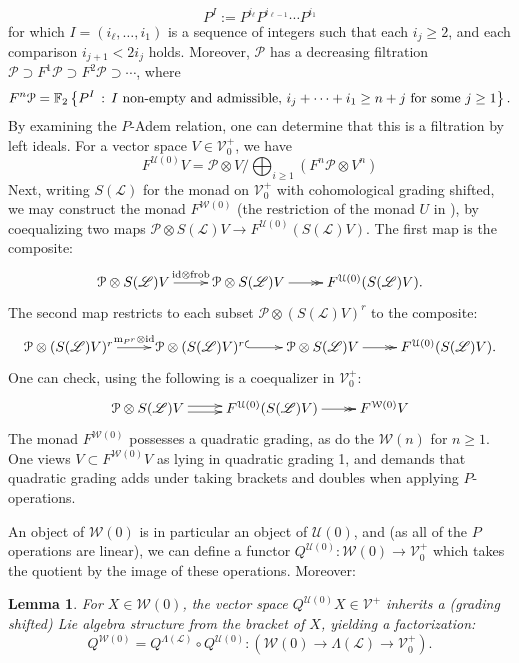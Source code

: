 \documentclass[11pt]{amsart}
\theoremstyle{plain}
\newtheorem{lem}[thm]{Lemma}
\theoremstyle{definition}
\renewcommand{\to}{\longrightarrow}
\newcommand{\scrL}{\mathscr{L}}
\newcommand{\calU}{\mathcal{U}}
\newcommand{\calP}{\mathcal{P}}
\newcommand{\calL}{\mathcal{L}}
\newcommand{\calV}{\mathcal{V}}
\newcommand{\calw}{\mathcal{W}}
\theoremstyle{plain}
\newcommand{\Palg}{{\calP}}
\newcommand{\LieOperad}{{\scrL}}
\newcommand{\vect}[2]{\calV^{#1}_{#2}}
\newcommand{\F}{\mathbb{F}}
\newcommand{\Id}{\textup{id}}
\newcommand{\Ftwo}{\F_2}
\begin{document}
\begin{Constructing (co)homotopy operations}
\begin{shaded}
\[P^I:=P^{i_\ell}P^{i_{\ell-1}}\cdots P^{i_1}\]
for which $I=(i_\ell,\ldots,i_1)$ is a sequence of integers such that each $i_j\geq2$, and  each comparison $i_{j+1}< 2i_j$ holds. Moreover, $\Palg$ has a decreasing filtration $\Palg\supset F^1\Palg\supset F^2\Palg\supset\cdots $, where
\[F^n\Palg=\Ftwo \left\{P^I\,:\,\textup{$I$ non-empty and admissible, }i_j+\cdots +i_1\geq n+j\textup{ for some $j\geq 1$}\right\}.\]
By examining the $P$-Adem relation, one can determine that this is a filtration by left ideals. For a vector space $V\in\vect{+}{0}$, we have
\[F^{\calU(0)}V=\Palg\otimes V/\bigoplus_{i\geq1}(F^n\Palg\otimes V^n)\]
Next, writing $S(\LieOperad)$ for the monad on $\vect{+}{0}$ with cohomological grading shifted, we may construct the monad $F^{\calw(0)}$ (the restriction of the monad $U$ in \cite[p.\ 18]{MR1089001}), by coequalizing two maps $\Palg\otimes S(\LieOperad)V\to F^{\calU(0)} (S(\LieOperad)V)$. The first map is the composite:
\[\xymatrix@R=4mm{
\Palg\otimes S(\LieOperad)V\ar[r]^-{\Id\otimes \textup{frob}}
&%
\Palg\otimes S(\LieOperad)V\ar@{->>}[r]&%
F^{\calU(0)}(S(\LieOperad)V).%
}\]
The second map restricts to each subset $\Palg\otimes (S(\LieOperad)V)^r$ to the composite:
\[\xymatrix@R=4mm{
\Palg\otimes (S(\LieOperad)V)^r\ar[r]^-{\textup{m}_{P^r}\otimes\Id}
&
\Palg\otimes (S(\LieOperad)V)^r\ar@{^{(}->}[r]
&%
\Palg\otimes S(\LieOperad)V\ar@{->>}[r]&%
F^{\calU(0)}(S(\LieOperad)V).%
}\]
One can check, using \cite[p.\ 18]{MR1089001} the following is a coequalizer in $\vect{+}{0}$:
\[\xymatrix@R=4mm{
\Palg\otimes S(\LieOperad)V\ar@<.5ex>[r]\ar@<-.5ex>[r]
&%
F^{\calU(0)}(S(\LieOperad)V)\ar@{->>}[r]
&%
F^{\calw(0)}V%
}\]
The monad $F^{\calw(0)}$ possesses a quadratic grading, as do the $\calw(n)$ for $n\geq1$. One views $V\subset F^{\calw(0)}V$ as lying in quadratic grading 1, and demands that quadratic grading adds under taking brackets and doubles when applying $P$-operations.
\end{shaded}
An object of $\calw(0)$ is in particular an object of $\calU(0)$, and (as all of the $P$ operations are linear), we can define a functor $Q^{\calU(0)}:\calw(0)\to\vect{+}{0}$ which takes the quotient by the image of these operations. Moreover:
\begin{lem}\label{Kill P ops gives lie alg}
For $X\in\calw(0)$, the vector space $Q^{\calU(0)}X\in\vect{+}{}$ inherits a (grading shifted) Lie algebra structure from the bracket of $X$, yielding a factorization:%
\[Q^{\calw(0)}=Q^{\Lambda(\LieOperad)}\circ Q^{\calU(0)}:\left(\calw(0)\to \Lambda(\LieOperad)\to \vect{+}{0}\right).\]

\end{lem}
\end{Constructing (co)homotopy operations}
\end{document}
